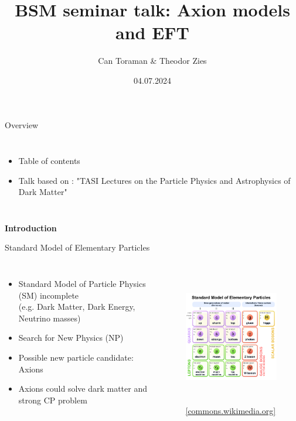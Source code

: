 \documentclass[aspectratio=1610, 9pt]{beamer}
\title{BSM seminar talk: Axion models and EFT}
\author{Can Toraman \& Theodor Zies}
\date{04.07.2024}
\institute[Department of physics]{Supervision: Prof. Dr. Gudrun Hiller}
\begin{document}
\begin{frame}
\titlepage
\end{frame}

\begin{frame}{Overview}
  \begin{columns}
    \column{\textwidth}
    \begin{itemize}
      \item Table of contents
      \item Talk based on : "TASI Lectures on the Particle Physics and Astrophysics of Dark Matter"
    \end{itemize}
  \end{columns} 
\end{frame}

\begin{frame}[noframenumbering]
  \centering
  \Huge \textbf{\textcolor{tugreen}{Introduction}}
\end{frame}

\begin{frame}{Standard Model of Elementary Particles}
  \begin{columns}
    \centering
    \begin{itemize}
      \item Standard Model of Particle Physics (SM) incomplete \\ (e.g. Dark Matter, Dark Energy, Neutrino masses)
      \item Search for New Physics (NP)
      \item Possible new particle candidate: Axions
      \item Axions could solve dark matter and strong CP problem
    \end{itemize}
    \begin{figure}
    \includegraphics[height=6cm]{images/SM.pdf}
    \caption{\footnotesize \href{https://commons.wikimedia.org/wiki/File:Standard_Model_of_Elementary_Particles.svg}{{[commons.wikimedia.org]}}}
    \end{figure}
  \end{columns} 
\end{frame}
\end{document}
